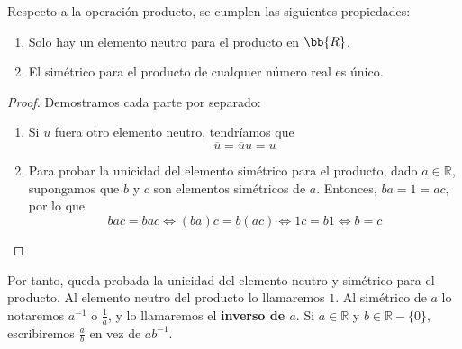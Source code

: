 \begin{prop} Respecto a la operación producto, se cumplen las siguientes propiedades:
    \begin{enumerate}
        \item Solo hay un elemento neutro para el producto en $\bb{R}$.
        \item El simétrico para el producto de cualquier número real es único.
    \end{enumerate}
\end{prop}
\begin{proof} Demostramos cada parte por separado:
\begin{enumerate}
    \item Si $\overline{u}$ fuera otro elemento neutro, tendríamos que
    \begin{equation*}
        \overline{u} = \overline{u}u = u
    \end{equation*}

    \item Para probar la unicidad del elemento simétrico para el producto, dado $a \in \mathbb{R}$, supongamos que $b$ y $c$ son elementos simétricos de $a$.
    Entonces, $ba=1=ac$, por lo que
    \begin{equation*}
        bac=bac \Longleftrightarrow (ba)c=b(ac) \Longleftrightarrow 1c=b1 \Longleftrightarrow b=c
    \end{equation*}
\end{enumerate}
\end{proof}

Por tanto, queda probada la unicidad del elemento neutro y simétrico para el producto. Al elemento neutro del producto lo llamaremos $1$.
Al simétrico de $a$ lo notaremos $a^{-1}$ o $\frac{1}{a}$, y lo llamaremos el \textbf{inverso de $a$}.
Si $a \in \mathbb{R}$ y $b \in \mathbb{R}-\{0\}$, escribiremos $\frac{a}{b}$ en vez de $ab^{-1}$.


